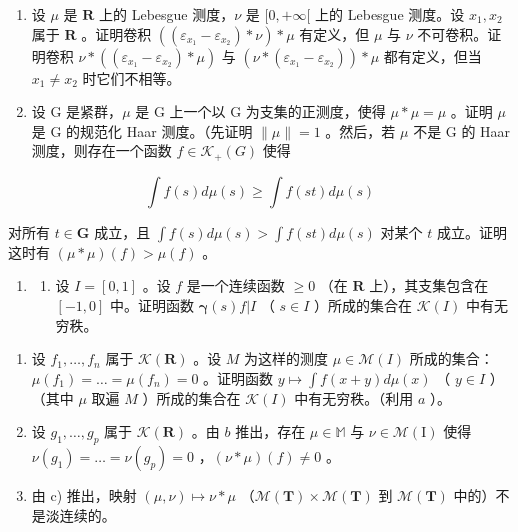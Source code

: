 \begin{enumerate}
\def\labelenumi{\arabic{enumi})}
\setcounter{enumi}{3}
\item
  设 \(\mu\) 是 \(\mathbf{R}\) 上的 Lebesgue 测度，\(\nu\) 是 \([0, +\infty[\) 上的 Lebesgue 测度。设 \(x_1, x_2\) 属于 \(\mathbf{R}\) 。证明卷积 \(((\varepsilon_{x_1} - \varepsilon_{x_2}) * \nu) * \mu\) 有定义，但 \(\mu\) 与 \(\nu\) 不可卷积。证明卷积 \(\nu * ((\varepsilon_{x_1} - \varepsilon_{x_2}) * \mu)\) 与 \((\nu * (\varepsilon_{x_1} - \varepsilon_{x_2})) * \mu\) 都有定义，但当 \(x_1 \neq x_2\) 时它们不相等。
\item
  设 G 是紧群，\(\mu\) 是 G 上一个以 G 为支集的正测度，使得 \(\mu*\mu=\mu\) 。证明 \(\mu\) 是 G 的规范化 Haar 测度。（先证明 \(\|\mu\|=1\) 。然后，若 \(\mu\) 不是 G 的 Haar 测度，则存在一个函数 \(f\in\mathcal{K}_{+}(G)\) 使得
\end{enumerate}

\[
\int f (s) d \mu (s) \geqslant \int f (s t) d \mu (s)
\]

对所有 \(t \in \mathbf{G}\) 成立，且 \(\int f(s) d\mu(s) > \int f(st) d\mu(s)\) 对某个 \(t\) 成立。证明这时有 \((\mu * \mu)(f) > \mu(f)\) 。

\begin{enumerate}
\def\labelenumi{\arabic{enumi})}
\setcounter{enumi}{5}
\tightlist
\item
  \begin{enumerate}
  \def\labelenumii{\alph{enumii})}
  \tightlist
  \item
    设 \(I = [0,1]\) 。设 \(f\) 是一个连续函数 \(\geqslant 0\) （在 \(\mathbf{R}\) 上），其支集包含在 \([-1,0]\) 中。证明函数 \(\pmb{\gamma}(s)f|I\) （ \(s \in I\) ）所成的集合在 \(\mathcal{K}(I)\) 中有无穷秩。
  \end{enumerate}
\end{enumerate}

\begin{enumerate}
\def\labelenumi{\alph{enumi})}
\setcounter{enumi}{1}
\item
  设 \(f_1, \ldots, f_n\) 属于 \(\mathcal{K}(\mathbf{R})\) 。设 \(M\) 为这样的测度 \(\mu \in \mathcal{M}(I)\) 所成的集合：\(\mu(f_1) = \ldots = \mu(f_n) = 0\) 。证明函数 \(y \mapsto \int f(x + y) d\mu(x)\) （ \(y \in I\) ）（其中 \(\mu\) 取遍 \(M\) ）所成的集合在 \(\mathcal{K}(I)\) 中有无穷秩。（利用 \(a\) ）。
\item
  设 \(g_1, \ldots, g_p\) 属于 \(\mathcal{K}(\mathbf{R})\) 。由 \(b\) 推出，存在 \(\mu \in \mathbb{M}\) 与 \(\nu \in \mathcal{M}(\mathrm{I})\) 使得 \(\nu(g_1) = \ldots = \nu(g_p) = 0\) ，\((\nu * \mu)(f) \neq 0\) 。
\item
  由 c) 推出，映射 \((\mu,\nu)\mapsto\nu*\mu\) （\(\mathcal{M}(\mathbf{T})\times\mathcal{M}(\mathbf{T})\) 到 \(\mathcal{M}(\mathbf{T})\) 中的）不是淡连续的。
\end{enumerate}

